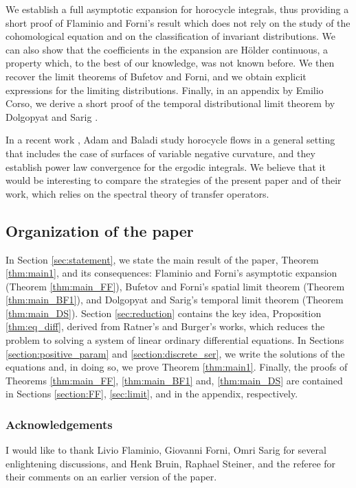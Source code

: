 \documentclass[JEP,XML,SOM,NoEqCountersInSection,Unicode,published]{cedram}
\theoremstyle{definition}
\begin{document}
We establish a full asymptotic expansion for horocycle integrals, thus providing a short proof of Flaminio and Forni's result which does not rely on the study of the cohomological equation and on the classification of invariant distributions.
We can also show that the coefficients in the expansion are Hölder continuous, a property which, to the best of our knowledge, was not known before.
We then recover the limit theorems of Bufetov and Forni, and we obtain explicit expressions for the limiting distributions.
Finally, in an appendix by Emilio Corso, we derive a short proof of the temporal distributional limit theorem by Dolgopyat and Sarig \cite{Dolgopyat-Sarig}.

In a recent work \cite{AdBa}, Adam and Baladi study horocycle flows in a general setting that includes the case of surfaces of variable negative curvature, and they establish power law convergence for the ergodic integrals. We believe that it would be interesting to compare the strategies of the present paper and of their work, which relies on the spectral theory of transfer operators.

\subsection{Organization of the paper}

In Section \ref{sec:statement}, we state the main result of the paper, Theorem \ref{thm:main1}, and its consequences: Flaminio and Forni's asymptotic expansion (Theorem \ref{thm:main_FF}), Bufetov and Forni's spatial limit theorem (Theorem \ref{thm:main_BF1}), and Dolgopyat and Sarig's temporal limit theorem (Theorem \ref{thm:main_DS}).
Section \ref{sec:reduction} contains the key idea, Proposition \ref{thm:eq_diff}, derived from Ratner's and Burger's works, which reduces the problem to solving a system of linear ordinary differential equations. In Sections \ref{section:positive_param} and \ref{section:discrete_ser}, we write the solutions of the equations and, in doing so, we prove Theorem \ref{thm:main1}. Finally, the proofs of Theorems \ref{thm:main_FF}, \ref{thm:main_BF1} and, \ref{thm:main_DS} are contained in Sections \ref{section:FF}, \ref{sec:limit}, and in the appendix, respectively.

\subsubsection*{Acknowledgements}
I would like to thank Livio Flaminio, Giovanni Forni, Omri Sarig for several enlightening discussions, and Henk Bruin, Raphael Steiner, and the referee for their comments on an earlier version of the paper.
\end{document}
